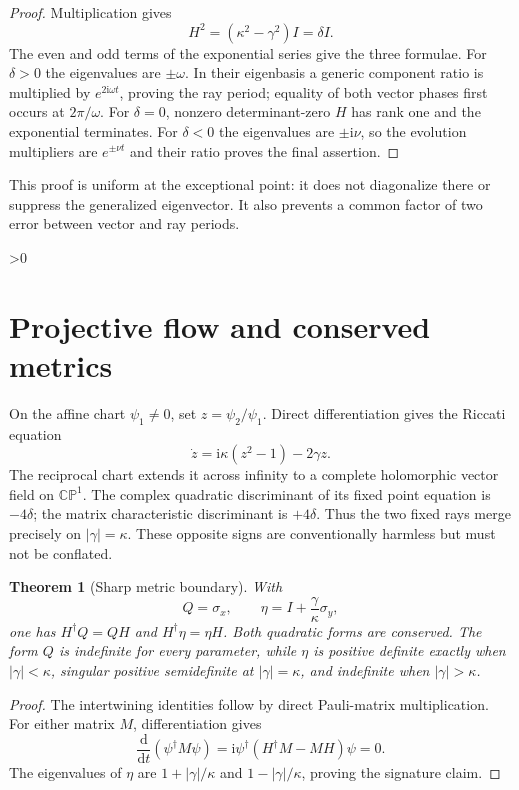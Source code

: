 \documentclass[10pt]{article}
\providecommand{\CRevisionRound}{2}
\newtheorem{theorem}{Theorem}
\newcommand{\CP}{\mathbb {CP}}
\newcommand{\dd}{\mathrm d}
\newcommand{\ii}{\mathrm i}
\begin{document}
\begin{proof}
Multiplication gives
\[
H^2=(\kappa^2-\gamma^2)I=\delta I.
\]
The even and odd terms of the exponential series give the three formulae.
For $\delta>0$ the eigenvalues are $\pm\omega$.  In their eigenbasis a
generic component ratio is multiplied by $e^{2\ii\omega t}$, proving the ray
period; equality of both vector phases first occurs at $2\pi/\omega$.  For
$\delta=0$, nonzero determinant-zero $H$ has rank one and the exponential
terminates.  For $\delta<0$ the eigenvalues are $\pm\ii\nu$, so the evolution
multipliers are $e^{\pm\nu t}$ and their ratio proves the final assertion.
\end{proof}

This proof is uniform at the exceptional point: it does not diagonalize there
or suppress the generalized eigenvector.  It also prevents a common factor
of two error between vector and ray periods.

\ifnum\CRevisionRound>0
\section{Projective flow and conserved metrics}
On the affine chart $\psi_1\ne0$, set $z=\psi_2/\psi_1$.  Direct
differentiation gives the Riccati equation
\begin{equation}\label{eq:riccati}
 \dot z=\ii\kappa(z^2-1)-2\gamma z.
\end{equation}
The reciprocal chart extends it across infinity to a complete holomorphic
vector field on $\CP^1$.  The complex quadratic discriminant of its fixed
point equation is $-4\delta$; the matrix characteristic discriminant is
$+4\delta$.  Thus the two fixed rays merge precisely on
$|\gamma|=\kappa$.  These opposite signs are conventionally harmless but
must not be conflated.

\begin{theorem}[Sharp metric boundary]\label{thm:metric}
With
\[
 Q=\sigma_x,\qquad
 \eta=I+\frac{\gamma}{\kappa}\sigma_y,
\]
one has $H^\dagger Q=QH$ and $H^\dagger\eta=\eta H$.  Both quadratic
forms are conserved.  The form $Q$ is indefinite for every parameter, while
$\eta$ is positive definite exactly when $|\gamma|<\kappa$, singular
positive semidefinite at $|\gamma|=\kappa$, and indefinite when
$|\gamma|>\kappa$.
\end{theorem}

\begin{proof}
The intertwining identities follow by direct Pauli-matrix multiplication.
For either matrix $M$, differentiation gives
\[
 \frac{\dd}{\dd t}(\psi^\dagger M\psi)
 =\ii\psi^\dagger(H^\dagger M-MH)\psi=0.
\]
The eigenvalues of $\eta$ are
$1+|\gamma|/\kappa$ and $1-|\gamma|/\kappa$, proving the signature claim.
\end{proof}
\end{document}
